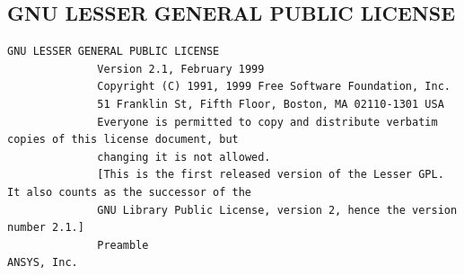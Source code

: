\subsection{GNU LESSER GENERAL PUBLIC LICENSE}

\begin{lstlisting}[basicstyle=\ttfamily\scriptsize,breaklines=true]
GNU LESSER GENERAL PUBLIC LICENSE
              Version 2.1, February 1999
              Copyright (C) 1991, 1999 Free Software Foundation, Inc.
              51 Franklin St, Fifth Floor, Boston, MA 02110-1301 USA
              Everyone is permitted to copy and distribute verbatim copies of this license document, but
              changing it is not allowed.
              [This is the first released version of the Lesser GPL. It also counts as the successor of the
              GNU Library Public License, version 2, hence the version number 2.1.]
              Preamble
ANSYS, Inc.


\end{lstlisting}
